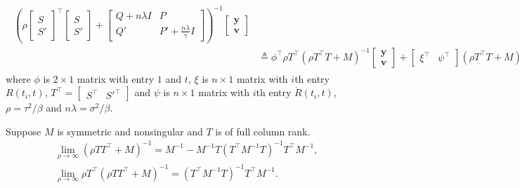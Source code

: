 \begin{align}
\begin{split}
\left(\rho\begin{bmatrix} S \\ S' \end{bmatrix}^\top \begin{bmatrix} S \\ S' \end{bmatrix}+
\begin{bmatrix} Q+n\lambda I& P\\
Q'& P'+\frac{n\lambda}{\gamma}I\end{bmatrix}\right) ^{-1}
\begin{bmatrix}\mathbf{y}\\ \mathbf{v} \end{bmatrix}\\
&\triangleq\phi^\top \rho T^\top \left(\rho T^\top T+M\right) ^{-1} \begin{bmatrix}\mathbf{y}\\ \mathbf{v} \end{bmatrix}
+ \begin{bmatrix} \xi^\top & \psi^\top\end{bmatrix}\left(\rho T^\top T+M\right) ^{-1} \begin{bmatrix}\mathbf{y}\\ \mathbf{v} \end{bmatrix}
\end{split}
\end{align}\normalsize
where $\phi$ is $2 \times 1$ matrix with entry $1$ and $t$, $\xi$ is $n\times 1$ matrix with $i$th entry $R(t_i,t)$, $T^\top =\begin{bmatrix} S^\top & S'^\top \end{bmatrix}$ and $\psi$ is $n\times 1$ matrix with $i$th entry  $\dot{R}(t_i,t)$, $\rho=\tau^2/\beta$ and $n\lambda =\sigma^2/\beta$. 

\begin{lemma}\label{GPLemma}
	Suppose $M$ is symmetric and nonsingular and $T$ is of full column rank. 
	\begin{align*}
	&\lim\limits_{\rho \rightarrow \infty}\left(\rho TT^\top+M\right)^{-1}=M^{-1}-M^{-1}T\left(T^\top M^{-1}T\right)^{-1}T^\top M^{-1},\\
	&\lim\limits_{\rho \rightarrow \infty}\rho T^\top\left(\rho TT^\top+M\right)^{-1}=\left(T^\top M^{-1}T\right)^{-1}T^\top M^{-1}.
	\end{align*}
\end{lemma}

